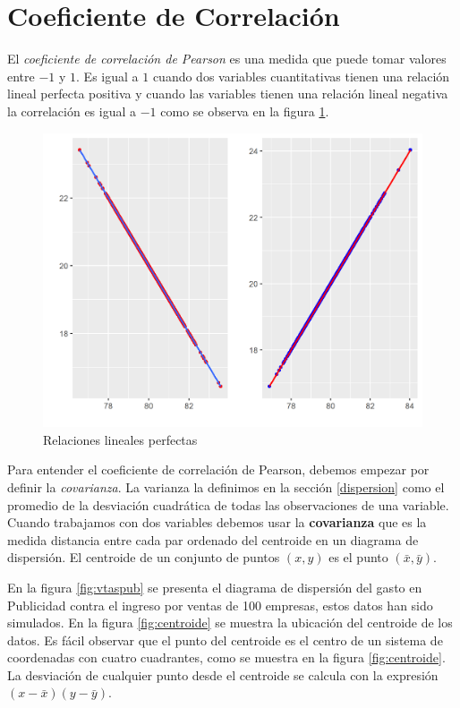 \documentclass[
]{krantz}
\begin{document}
\hypertarget{correl}{%
\section{Coeficiente de Correlación}\label{correl}}

El \emph{coeficiente de correlación de Pearson} es una medida que puede tomar valores entre \(-1\) y \(1\). Es igual a \(1\) cuando dos variables cuantitativas tienen una relación lineal perfecta positiva y cuando las variables tienen una relación lineal negativa la correlación es igual a \(-1\) como se observa en la figura \ref{fig:corr5}.

\begin{figure}[!h]

{\centering \includegraphics[width=0.5\linewidth]{corr4} 

}

\caption{Relaciones lineales perfectas}\label{fig:corr5}
\end{figure}

Para entender el coeficiente de correlación de Pearson, debemos empezar por definir la \emph{covarianza}. La varianza la definimos en la sección \ref{dispersion} como el promedio de la desviación cuadrática de todas las observaciones de una variable. Cuando trabajamos con dos variables debemos usar la \textbf{covarianza} que es la medida distancia entre cada par ordenado del centroide en un diagrama de dispersión. El centroide de un conjunto de puntos \(\left(x,y\right)\) es el punto \(\left(\bar{x},\bar{y}\right)\).

En la figura \ref{fig:vtaspub} se presenta el diagrama de dispersión del gasto en Publicidad contra el ingreso por ventas de 100 empresas, estos datos han sido simulados. En la figura \ref{fig:centroide} se muestra la ubicación del centroide de los datos. Es fácil observar que el punto del centroide es el centro de un sistema de coordenadas con cuatro cuadrantes, como se muestra en la figura \ref{fig:centroide}. La desviación de cualquier punto desde el centroide se calcula con la expresión \(\left(x-\bar{x}\right)\left(y-\bar{y}\right)\).
\end{document}
